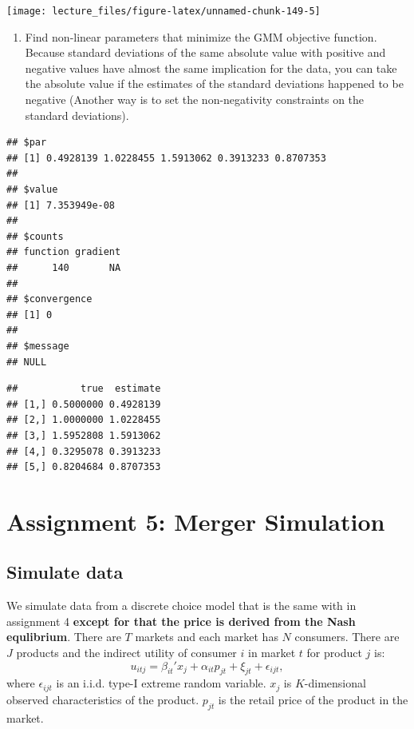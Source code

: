 \documentclass[
]{book}
\providecommand{\tightlist}{%
  \setlength{\itemsep}{0pt}\setlength{\parskip}{0pt}}
\begin{document}
\begin{center}\texttt{[image: lecture\_files/figure-latex/unnamed-chunk-149-5]} \end{center}

\begin{enumerate}
\def\labelenumi{\arabic{enumi}.}
\setcounter{enumi}{12}
\tightlist
\item
  Find non-linear parameters that minimize the GMM objective function. Because standard deviations of the same absolute value with positive and negative values have almost the same implication for the data, you can take the absolute value if the estimates of the standard deviations happened to be negative (Another way is to set the non-negativity constraints on the standard deviations).
\end{enumerate}

\begin{verbatim}
## $par
## [1] 0.4928139 1.0228455 1.5913062 0.3913233 0.8707353
## 
## $value
## [1] 7.353949e-08
## 
## $counts
## function gradient 
##      140       NA 
## 
## $convergence
## [1] 0
## 
## $message
## NULL
\end{verbatim}

\begin{verbatim}
##           true  estimate
## [1,] 0.5000000 0.4928139
## [2,] 1.0000000 1.0228455
## [3,] 1.5952808 1.5913062
## [4,] 0.3295078 0.3913233
## [5,] 0.8204684 0.8707353
\end{verbatim}

\hypertarget{assignment5}{%
\chapter{Assignment 5: Merger Simulation}\label{assignment5}}

\hypertarget{simulate-data-4}{%
\section{Simulate data}\label{simulate-data-4}}

We simulate data from a discrete choice model that is the same with in assignment 4 \textbf{except for that the price is derived from the Nash equlibrium}. There are \(T\) markets and each market has \(N\) consumers. There are \(J\) products and the indirect utility of consumer \(i\) in market \(t\) for product \(j\) is:
\[
u_{itj} = \beta_{it}' x_j + \alpha_{it} p_{jt} + \xi_{jt} + \epsilon_{ijt},
\]
where \(\epsilon_{ijt}\) is an i.i.d. type-I extreme random variable. \(x_j\) is \(K\)-dimensional observed characteristics of the product. \(p_{jt}\) is the retail price of the product in the market.
\end{document}
